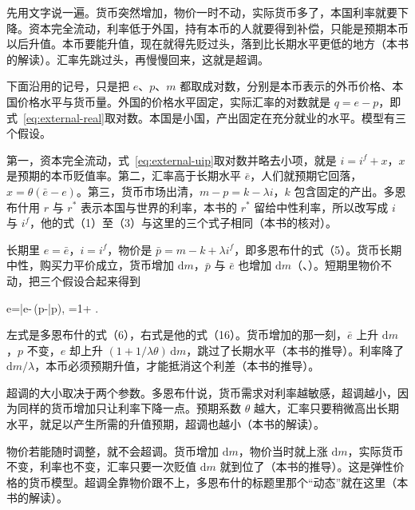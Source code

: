先用文字说一遍。货币突然增加，物价一时不动，实际货币多了，本国利率就要下降。资本完全流动，利率低于外国，持有本币的人就要得到补偿，只能是预期本币以后升值。本币要能升值，现在就得先贬过头，落到比长期水平更低的地方（本书的解读）。汇率先跳过头，再慢慢回来，这就是超调。

下面沿用的记号，只是把 $e$、$p$、$m$ 都取成对数，分别是本币表示的外币价格、本国价格水平与货币量。外国的价格水平固定，实际汇率的对数就是 $q=e-p$，即式~\eqref{eq:external-real}取对数。本国是小国，产出固定在充分就业的水平。模型有三个假设\cite{dornbusch1976}。

第一，资本完全流动，式~\eqref{eq:external-uip}取对数并略去小项，就是 $i=i^{f}+x$，$x$ 是预期的本币贬值率。第二，汇率高于长期水平 $\bar e$，人们就预期它回落，$x=\theta(\bar e-e)$。第三，货币市场出清，$m-p=k-\lambda i$，$k$ 包含固定的产出\cite{dornbusch1976}。多恩布什用 $r$ 与 $r^{*}$ 表示本国与世界的利率，本书的 $r^{*}$ 留给中性利率，所以改写成 $i$ 与 $i^{f}$，他的式（1）至（3）与这里的三个式子相同（本书的核对）。

长期里 $e=\bar e$，$i=i^{f}$，物价是 $\bar p=m-k+\lambda i^{f}$，即多恩布什的式（5）\cite{dornbusch1976}。货币长期中性，购买力平价成立，货币增加 $\mathrm{d}m$，$\bar p$ 与 $\bar e$ 也增加 $\mathrm{d}m$（、）。短期里物价不动，把三个假设合起来得到
\begin{keyeq}
e=\bar e-\,(p-\bar p),\qquad
{}=1+ .\label{eq:floating-overshoot}
\end{keyeq}
左式是多恩布什的式（6），右式是他的式（16）\cite{dornbusch1976}。货币增加的那一刻，$\bar e$ 上升 $\mathrm{d}m$，$p$ 不变，$e$ 却上升 $(1+1/\lambda\theta)\,\mathrm{d}m$，跳过了长期水平（本书的推导）。利率降了 $\mathrm{d}m/\lambda$，本币必须预期升值，才能抵消这个利差（本书的推导）。

超调的大小取决于两个参数。多恩布什说，货币需求对利率越敏感，超调越小，因为同样的货币增加只让利率下降一点\cite{dornbusch1976}。预期系数 $\theta$ 越大，汇率只要稍微高出长期水平，就足以产生所需的升值预期，超调也越小（本书的解读）。

物价若能随时调整，就不会超调。货币增加 $\mathrm{d}m$，物价当时就上涨 $\mathrm{d}m$，实际货币不变，利率也不变，汇率只要一次贬值 $\mathrm{d}m$ 就到位了（本书的推导）。这是弹性价格的货币模型。超调全靠物价跟不上，多恩布什的标题里那个“动态”就在这里（本书的解读）。

